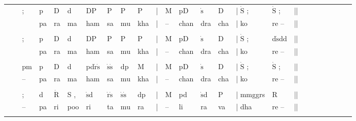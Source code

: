 \documentclass[12pt]{article}
\newcommand*\od[1]{\mathrm{\dot{#1}}}
\begin{document}
\begin{tabu}{l l l l l l l l l l l l l l l l l l l l l l l l l }

&&; &p&D&d&DP&P&P&P&|&M& pD&$\od{s}$&D&| $\od{S}$ ;&$\od{S}$ ;&||\\
\rowfont{\scriptsize}&& &pa&ra&ma&ham &sa&mu&kha&|&--&chan&dra& cha&| ko&re --&||\\
\\
&&; &p&D&d&DP&P&P&P&|&M& pD&$\od{s}$&D&| $\od{S}$ ;&d$\od{s}$dd&||\\
\rowfont{\scriptsize}&& &pa&ra&ma&ham &sa&mu&kha&|&--&chan&dra& cha&| ko&re --&||\\
\\
&&pm &p&D&d&pd$\od{r}$$\od{s}$&$\od{s}$$\od{s}$&dp&M&|&M& pD&$\od{s}$&D&| $\od{S}$ ;&$\od{S}$ ;&||\\
\rowfont{\scriptsize}&&--&pa&ra&ma&ham &sa&mu&kha&|&--&chan&dra& cha&| ko&re --&||\\
\\
&&; &d&$\od{R}$&S ,&$\od{s}$d&$\od{r}$$\od{s}$&$\od{s}$$\od{s}$&dp&|&M& pd &$\od{s}$d&P&| mmggrs&R&||\\
\rowfont{\scriptsize}&&--&pa&ri&poo&ri &ta&mu&ra&|&--&li&ra& va&| dha&re --&||\\
\\

\end{tabu}
\end{document}
